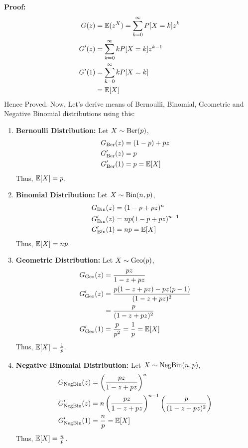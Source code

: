 \begin{solution}
	\textbf{Proof:} \begin{align}
		G(z)  & = \mathbb{E}(z^X) = \sum_{k=0}^\infty P[X=k]z^k \\
		G'(z) & = \sum_{k=0}^\infty kP[X=k]z^{k-1}      \\
		G'(1) & = \sum_{k=0}^\infty kP[X=k]             \\
		      & = \mathbb{E}[X]
	\end{align}
	Hence Proved.
	Now, Let's derive means of Bernoulli, Binomial, Geometric and Negative Binomial
	distributions using this:
	\begin{enumerate}
		\item \textbf{Bernoulli Distribution:} Let $X\sim\text{Ber}(p)$,
		      \begin{align}
			      G_{\text{Ber}}(z)  & = (1-p) + pz \\
			      G'_{\text{Ber}}(z) & = p          \\
			      G'_{\text{Ber}}(1) & = p = \mathbb{E}[X]
		      \end{align}
		      Thus, $\mathbb{E}[X] = p$.
		\item \textbf{Binomial Distribution:} Let $X\sim\text{Bin}(n,p)$,
		      \begin{align}
			      G_{\text{Bin}}(z)  & = (1-p + pz)^n       \\
			      G'_{\text{Bin}}(z) & = np(1-p + pz)^{n-1} \\
			      G'_{\text{Bin}}(1) & = np = \mathbb{E}[X]
		      \end{align}
		      Thus, $\mathbb{E}[X] = np$.
		\item \textbf{Geometric Distribution:} Let $X\sim\text{Geo}(p)$,
		      \begin{align}
			      G_{\text{Geo}}(z)  & = \frac{pz}{1-z+pz}                      \\
			      G'_{\text{Geo}}(z) & = \frac{p(1-z+pz) - pz(p-1)}{(1-z+pz)^2} \\
			                 & = \frac{p}{(1-z+pz)^2}                   \\
			      G'_{\text{Geo}}(1) & = \frac{p}{p^2} = \frac{1}{p} = \mathbb{E}[X]
		      \end{align}
		      Thus, $\mathbb{E}[X] = \frac{1}{p}$.
		\item \textbf{Negative Binomial Distribution:} Let $X\sim\text{NegBin}(n,p)$,
		      \begin{align}
			      G_{\text{NegBin}}(z)  & = \left( \frac{pz}{1-z+pz} \right)^n \\
			      G'_{\text{NegBin}}(z) & = n\left( \frac{pz}{1-z+pz}
			      \right)^{n-1}\left(\frac{p}{(1-z+pz)^2}\right)       \\
			      G'_{\text{NegBin}}(1) & = \frac{n}{p} = \mathbb{E}[X]
		      \end{align}
		      Thus, $\mathbb{E}[X] = \frac{n}{p}$.
	\end{enumerate}
\end{solution}
